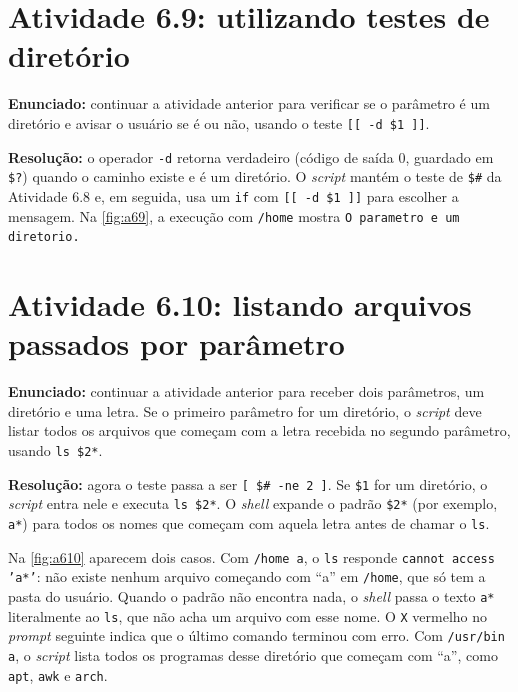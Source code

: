 \section{Atividade 6.9: utilizando testes de diretório}\label{sec:a69}

\textbf{Enunciado:} continuar a atividade anterior para verificar se o parâmetro é um
diretório e avisar o usuário se é ou não, usando o teste \texttt{[[ -d \$1 ]]}.

\textbf{Resolução:} o operador \texttt{-d} retorna verdadeiro (código de saída 0, guardado em
\texttt{\$?}) quando o caminho existe e é um diretório. O \textit{script} mantém o teste de
\texttt{\$\#} da Atividade 6.8 e, em seguida, usa um \texttt{if} com \texttt{[[ -d \$1 ]]} para
escolher a mensagem. Na \autoref{fig:a69}, a execução com \texttt{/home} mostra
\texttt{O parametro e um diretorio.}


\section{Atividade 6.10: listando arquivos passados por parâmetro}\label{sec:a610}

\textbf{Enunciado:} continuar a atividade anterior para receber dois parâmetros, um diretório e
uma letra. Se o primeiro parâmetro for um diretório, o \textit{script} deve listar todos os
arquivos que começam com a letra recebida no segundo parâmetro, usando \texttt{ls \$2*}.

\textbf{Resolução:} agora o teste passa a ser \texttt{[ \$\# -ne 2 ]}. Se \texttt{\$1} for um
diretório, o \textit{script} entra nele e executa \texttt{ls \$2*}. O \textit{shell} expande o
padrão \texttt{\$2*} (por exemplo, \texttt{a*}) para todos os nomes que começam com aquela
letra antes de chamar o \texttt{ls}.

Na \autoref{fig:a610} aparecem dois casos. Com \texttt{/home a}, o \texttt{ls} responde
\texttt{cannot access 'a*'}: não existe nenhum arquivo começando com ``a'' em \texttt{/home}, que
só tem a pasta do usuário. Quando o padrão não encontra nada, o \textit{shell} passa o texto
\texttt{a*} literalmente ao \texttt{ls}, que não acha um arquivo com esse nome. O \texttt{X}
vermelho no \textit{prompt} seguinte indica que o último comando terminou com erro. Com
\texttt{/usr/bin a}, o \textit{script} lista todos os programas desse diretório que começam com
``a'', como \texttt{apt}, \texttt{awk} e \texttt{arch}.

